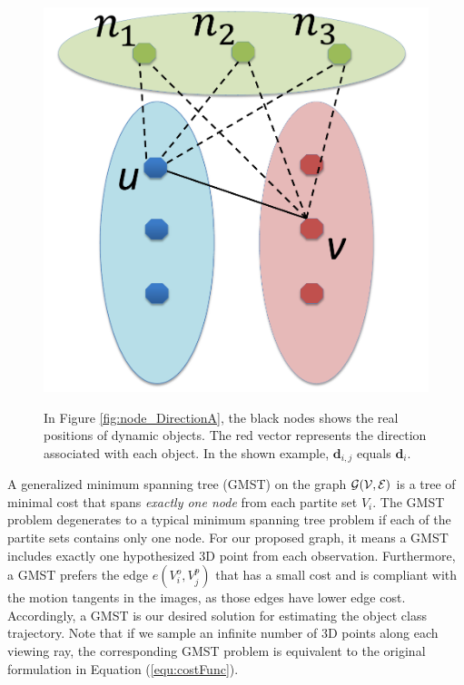 \begin{figure}[t]
{    \includegraphics[height=0.19\textheight]{chapter4/resource/edgeReduction_cropped.pdf}
    \label{fig:node_edgeRemove}
}

\caption[Illustration of the motion tangent.]{In Figure \ref{fig:node_DirectionA}, the black nodes shows the real positions of dynamic objects. The red vector represents the direction associated with each object. In the shown example, $\mathbf{d}_{i,j}$ equals $\mathbf{d}_{i}$.  }
\label{fig:nodeDirection}
\end{figure}

A generalized minimum spanning tree (GMST) on the graph $\cal{G}(V,E)$ is a tree of minimal cost that spans \emph{exactly one node} from each partite set $V_i$. The GMST problem degenerates to a typical minimum spanning tree problem \cite{Cormen:2001:IA:580470} if each of the partite sets contains only one node.
For our proposed graph, it means a GMST includes exactly one hypothesized 3D point from each observation. Furthermore, a GMST prefers the edge $e(V_i^o,V_j^p)$ that has a small cost and is compliant with the motion tangents in the images, as those edges have lower edge cost. Accordingly, a GMST is our desired solution for estimating the object class trajectory. Note that if we sample an infinite number of 3D points along each viewing ray, the corresponding GMST problem is equivalent to the original formulation in Equation (\ref{equ:costFunc}).%


